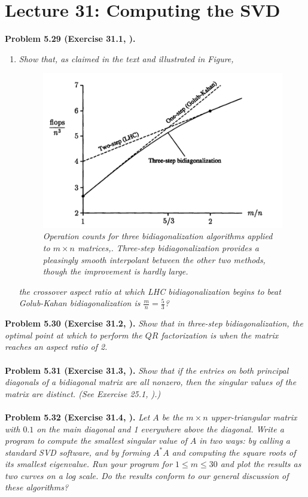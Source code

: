 \documentclass[a4paper,oneside]{book}
\numberwithin{equation}{chapter}
\begin{document}
\section{Lecture 31: Computing the SVD}
\textbf{Problem 5.29 (Exercise 31.1, \cite{1}).} 
\begin{enumerate}
\item \textit{Show that, as claimed in the text and illustrated in Figure,}
\begin{figure}[H]
	\centering
	\includegraphics[scale=0.35]{9}
	\caption{\textit{Operation counts for three bidiagonalization algorithms applied to $m\times n$ matrices,. Three-step bidiagonalization provides a pleasingly smooth interpolant between the other two methods, though the improvement is hardly large.}}
\end{figure}
\textit{the crossover aspect ratio at which LHC bidiagonalization begins to beat Golub-Kahan bidiagonalization is $\frac{m}{n} = \frac{5}{3}$?}
\end{enumerate}
\textbf{Problem 5.30 (Exercise 31.2, \cite{1}).} \textit{Show that in three-step bidiagonalization, the optimal point at which to perform the $QR$ factorization is when the matrix reaches an aspect ratio of 2.}\\
\\
\textbf{Problem 5.31 (Exercise 31.3, \cite{1}).} \textit{Show that if the entries on both principal diagonals of a bidiagonal matrix are all nonzero, then the singular values of the matrix are distinct. (See Exercise 25.1, \cite{1}).)}\\
\\
\textbf{Problem 5.32 (Exercise 31.4, \cite{1}).} \textit{Let $A$ be the $m\times n$ upper-triangular matrix with $0.1$ on the main diagonal and 1 everywhere above the diagonal. Write a program to compute the smallest singular value of $A$ in two ways: by calling a standard SVD software, and by forming $A^*A$ and computing the square roots of its smallest eigenvalue. Run your program for $1\le m\le 30$ and plot the results as two curves on a log scale. Do the results conform to our general discussion of these algorithms?}\\
\end{document}
